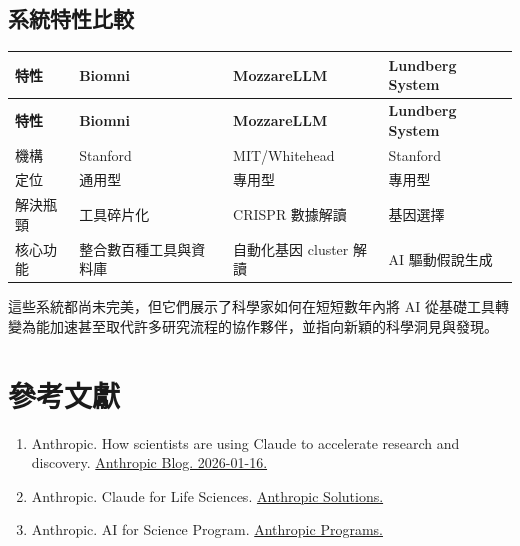 \documentclass[12pt,a4paper]{article}
\begin{document}
\subsection{系統特性比較}

\begin{longtable}{p{3cm}p{3.5cm}p{3.5cm}p{3.5cm}}
\toprule
\textbf{特性} & \textbf{Biomni} & \textbf{MozzareLLM} & \textbf{Lundberg System} \\
\midrule
\endfirsthead

\toprule
\textbf{特性} & \textbf{Biomni} & \textbf{MozzareLLM} & \textbf{Lundberg System} \\
\midrule
\endhead

\bottomrule
\endfoot

機構 & Stanford & MIT/Whitehead & Stanford \\
\midrule
定位 & 通用型 & 專用型 & 專用型 \\
\midrule
解決瓶頸 & 工具碎片化 & CRISPR 數據解讀 & 基因選擇 \\
\midrule
核心功能 & 整合數百種工具與資料庫 & 自動化基因 cluster 解讀 & AI 驅動假說生成 \\
\bottomrule
\end{longtable}

\begin{tcolorbox}[
    colback=emergency_blue!5!white,
    colframe=emergency_blue,
    title=\textbf{結語},
    fonttitle=\bfseries
]
這些系統都尚未完美，但它們展示了科學家如何在短短數年內將 AI 從基礎工具轉變為能加速甚至取代許多研究流程的協作夥伴，並指向新穎的科學洞見與發現。
\end{tcolorbox}

\section{參考文獻}

\begin{enumerate}
    \item Anthropic. How scientists are using Claude to accelerate research and discovery. \href{https://www.anthropic.com/news/accelerating-scientific-research}{Anthropic Blog. 2026-01-16.}

    \item Anthropic. Claude for Life Sciences. \href{https://www.anthropic.com/solutions/life-sciences}{Anthropic Solutions.}

    \item Anthropic. AI for Science Program. \href{https://www.anthropic.com/ai-for-science}{Anthropic Programs.}
\end{enumerate}
\end{document}
